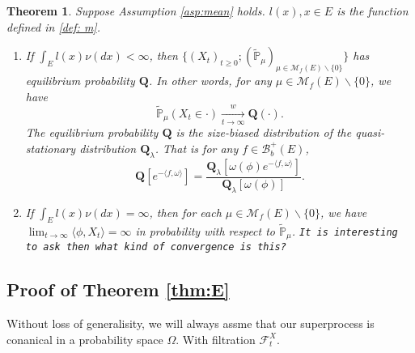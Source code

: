 \documentclass[12pt,a4paper]{amsart}
\numberwithin{equation}{section}
\theoremstyle{plain}
\newtheorem{thm}{Theorem}[section]
\theoremstyle{definition}
\theoremstyle{remark}
\begin{document}
{\begin{thm}\label{thm: structure of Qprocess}
	Suppose Assumption \ref{asp:mean} holds. $l(x), x\in E$ is the function defined in \eqref{def: m}.
\begin{enumerate}
\item
	If $\int_E l(x)\nu(dx)<\infty$, then $\{(X_t)_{t\geq 0};(\widetilde{\mathbb P}_\mu)_{\mu\in\mathcal M_f(E)\backslash\{0\}}\}$ has equilibrium probability ${\mathbf Q}$. In other words, for any $\mu\in\mathcal M_f(E)\backslash\{0\}$, we have
\[
	\widetilde{\mathbb P}_\mu(X_t \in \cdot ) \xrightarrow[t\to \infty]{w} {\mathbf Q}(\cdot).
\]
The equilibrium probability $\mathbf Q$ is the size-biased distribution of the quasi-stationary distribution $\mathbf Q_\lambda$. That is for any $f\in\mathcal B_b^+(E)$,
\[
  	\mathbf Q\left[e^{-\langle f,\omega\rangle}\right] = \dfrac{\mathbf Q_\lambda\left[\omega(\phi)e^{-\langle f,\omega\rangle}\right]}{\mathbf Q_\lambda[\omega(\phi)]}.
\]
\item
	If $\int_El(x)\nu(dx)=\infty$, then for each $\mu \in \mathcal M_f(E)\backslash\{0\}$, we have $\lim_{t\rightarrow\infty}\langle \phi, X_t\rangle =\infty$ in probability with respect to $\widetilde{\mathbb P}_\mu$. {\tt It is interesting to ask then what kind of convergence is this?}
\end{enumerate}
\end{thm}
}
\subsection{Proof of Theorem \ref{thm:E}}

{\color{blue}Without loss of generalisity, we will always assme that our superprocess is conanical in a probability space $\Omega$. With filtration $\mathscr F_t^X$.}
\end{document}
